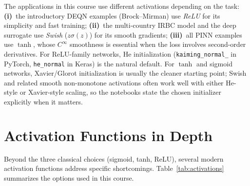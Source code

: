\documentclass[11pt,a4paper]{report}
\begin{document}
\begin{remarkbox}
The applications in this course use different activations depending on the task:
\textbf{(i)}~the introductory DEQN examples (Brock--Mirman) use \emph{ReLU} for its simplicity and fast training;
\textbf{(ii)}~the multi-country IRBC model and the deep surrogate use \emph{Swish} ($z\sigma(z)$) for its smooth gradients;
\textbf{(iii)}~all PINN examples use \emph{$\tanh$}, whose $C^\infty$ smoothness is essential when the loss involves second-order derivatives.
For ReLU-family networks, He initialization (\texttt{kaiming\_normal\_} in PyTorch, \texttt{he\_normal} in Keras) is the natural default.  For $\tanh$ and sigmoid networks, Xavier/Glorot initialization is usually the cleaner starting point; Swish and related smooth non-monotone activations often work well with either He-style or Xavier-style scaling, so the notebooks state the chosen initializer explicitly when it matters.
\end{remarkbox}

\section{Activation Functions in Depth}
\label{sec:activations}

Beyond the three classical choices (sigmoid, tanh, ReLU), several modern activation functions address specific shortcomings.  Table~\ref{tab:activations} summarizes the options used in this course.
\end{document}

